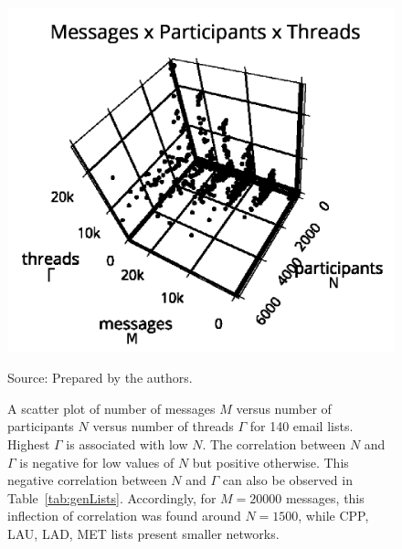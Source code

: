 \begin{figure}
\centering
\caption{A scatter plot of number of messages $M$ versus number of participants $N$ versus number of threads $\Gamma$ for 140 email lists.
Highest $\Gamma$ is associated with low $N$.
The correlation between $N$ and $\Gamma$ is negative for low values of $N$ but positive otherwise.
This negative correlation between $N$ and $\Gamma$ can also be observed in Table~\ref{tab:genLists}.
Accordingly, for $M=20000$ messages, this inflection
of correlation was found around $N=1500$, while CPP, LAU, LAD, MET lists 
present smaller networks.}
\includegraphics[trim={0 0 0 1cm},clip,width=.7\columnwidth]{figs/mpgamma2_}
\begin{flushleft}
		Source: Prepared by the authors.\
\end{flushleft}
\label{fig:nmgamma3d}
\end{figure}



